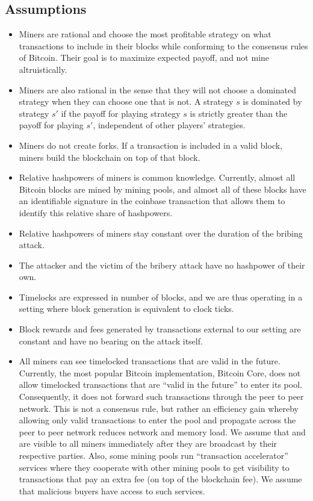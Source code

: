 \subsection{Assumptions}
\begin{itemize}
    \item Miners are rational and choose the most profitable strategy on what transactions to include in their blocks while conforming to the consensus rules of Bitcoin. Their goal is to maximize expected payoff, and not mine altruistically. 
    \item Miners are also rational in the sense that they will not choose a dominated strategy when they can choose one that is not. A strategy $s$ is dominated by strategy $s'$ if the payoff for playing strategy $s$ is strictly greater than the payoff for playing $s'$, independent of other players' strategies.
    \item Miners do not create forks. If a transaction is included in a valid block, miners build the blockchain on top of that block.
    \item Relative hashpowers of miners is common knowledge. Currently, almost all Bitcoin blocks are mined by mining pools, and almost all of these blocks have an identifiable signature in the coinbase transaction that allows them to identify this relative share of hashpowers. 
    \item Relative hashpowers of miners stay constant over the duration of the bribing attack.
    \item The attacker and the victim of the bribery attack have no hashpower of their own. 
    \item Timelocks are expressed in number of blocks, and we are thus operating in a setting where block generation is equivalent to clock ticks.
    \item Block rewards and fees generated by transactions external to our setting are constant and have no bearing on the attack itself. 
    \item All miners can see timelocked transactions that are valid in the future. Currently, the most popular Bitcoin implementation, Bitcoin Core, does not allow timelocked transactions that are ``valid in the future'' to enter its pool. Consequently, it does not forward such transactions through the peer to peer network. This is not a consensus rule, but rather an efficiency gain whereby allowing only valid transactions to enter the pool and propagate across the peer to peer network reduces network and memory load. We assume that \sellertxn{} and \bribetxn{} are visible to all miners immediately after they are broadcast by their respective parties. Also, some mining pools run ``transaction accelerator'' services where they cooperate with other mining pools to get visibility to transactions that pay an extra fee (on top of the blockchain fee). We assume that malicious buyers have access to such services.    
\end{itemize}

